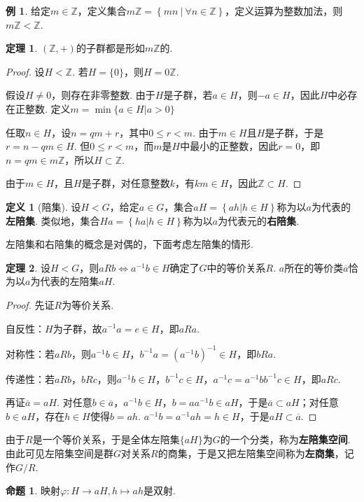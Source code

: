 \documentclass[12pt]{ctexart}
\theoremstyle{definition}
\newtheorem{definition}{定义}[section]
\newtheorem{theorem}{定理}[section]
\newtheorem{proposition}{命题}[section]
\newtheorem{example}{例}[section]
\theoremstyle{plain}
\begin{document}
\begin{example}
	给定$m\in\mathbb{Z}$，定义集合$m\mathbb{Z}=\left\{mn\ |\ \forall n\in\mathbb{Z}\right\}$，定义运算为整数加法，则$m\mathbb{Z}<\mathbb{Z}$.
\end{example}
\begin{theorem}
	$(\mathbb{Z},+)$的子群都是形如$m\mathbb{Z}$的.
\end{theorem}
\begin{proof}
	设$H<\mathbb{Z}$. 若$H=\{0\}$，则$H=0\mathbb{Z}$.
	
	假设$H\neq {0}$，则存在非零整数. 由于$H$是子群，若$a\in H$，则$-a \in H$，因此$H$中必存在正整数. 定义$m=\min\{a\in H|a>0\}$
	
	任取$n\in H$，设$n=qm+r$，其中$0\leqslant r<m$. 由于$m\in H$且$H$是子群，于是$r=n-qm\in H$. 但$0\leqslant r<m$，而$m$是$H$中最小的正整数，因此$r=0$，即$n=qm\in m\mathbb{Z}$，所以$H\subset\mathbb{Z}$.
	
	由于$m\in H$，且$H$是子群，对任意整数$k$，有$km\in H$，因此$\mathbb{Z}\subset H$.		
\end{proof}
\begin{definition}[陪集]
	设$H<G$，给定$a\in G$，集合$aH=\left\{ah|h\in H\right\}$称为以$a$为代表的\textbf{左陪集}. 类似地，集合$Ha=\left\{ha|h\in H\right\}$称为以$a$为代表元的\textbf{右陪集}.
\end{definition}
左陪集和右陪集的概念是对偶的，下面考虑左陪集的情形.
\begin{theorem}
	设$H<G$，则$aRb\iff a^{-1}b\in H$确定了$G$中的等价关系$R$. $a$所在的等价类$\overline{a}$恰为以$a$为代表的左陪集$aH$.
\end{theorem}
\begin{proof}
	先证$R$为等价关系.
	
	自反性：$H$为子群，故$a^{-1}a=e\in H$，即$aRa$.
	
	对称性：若$aRb$，则$a^{-1}b\in H$，$b^{-1}a=\left(a^{-1}b\right)^{-1}\in H$，即$bRa$.
	
	传递性：若$aRb$，$bRc$，则$a^{-1}b\in H$，$b^{-1}c\in H$，$a^{-1}c=a^{-1}bb^{-1}c\in H$，即$aRc$.
	
	再证$\overline{a}=aH$. 对任意$b\in\overline{a}$，$a^{-1}b\in H$，$b=aa^{-1}b\in aH$，于是$\overline{a}\subset aH$；对任意$b\in aH$，存在$h\in H$使得$b=ah$. $a^{-1}b=a^{-1}ah=h\in H$，于是$aH\subset\overline{a}$.
\end{proof}
由于$R$是一个等价关系，于是全体左陪集$\{aH\}$为$G$的一个分类，称为\textbf{左陪集空间}. 由此可见左陪集空间是群$G$对关系$R$的商集，于是又把左陪集空间称为\textbf{左商集}，记作$G/R$.
\begin{proposition}\label{subgroup-bijection}
	映射$\varphi:H\to aH,h\mapsto ah$是双射.
\end{proposition}
\end{document}
